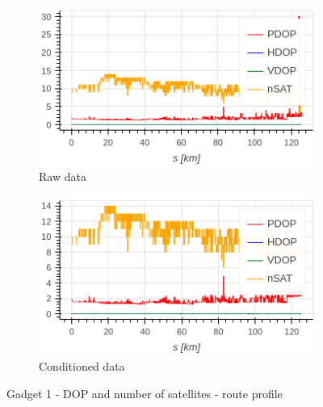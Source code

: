 \documentclass{article}
\begin{document}
			\begin{figure}[h]
		    	\centering
		     	\begin{subfigure}[b]{0.45\textwidth}
		      		\centering
		      	   \includegraphics[width=\textwidth]{raw_dop_1.png}
		      	   \caption{Raw data}
		      	   \label{fig:Gadget1_raw_dop}
		     	\end{subfigure}
		     	\begin{subfigure}[b]{0.45\textwidth}
		      	   \centering
		      	   \includegraphics[width=\textwidth]{cond_dop_1.png}
		      	   \caption{Conditioned data}
		      	   \label{fig:Gadget1_cond_dop}
		     	\end{subfigure}
		      \caption{Gadget 1 - DOP and number of satellites - route profile}
		      \label{fig:Gadget1_dop}
			\end{figure}
\end{document}
